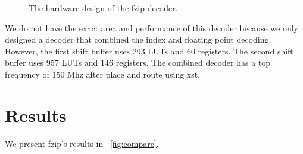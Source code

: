 \begin{figure}
    \caption{The hardware design of the fzip decoder.}
    \label{fig:fzip_decoder}
\end{figure}

We do not have the exact area and performance of this decoder because we only designed a decoder that combined the index and floating point decoding. However, the first shift buffer uses 293 LUTs and 60 registers. The second shift buffer uses 957 LUTs and 146 registers. The combined decoder has a top frequency of 150 Mhz after place and route using xst.
\section{Results}
\label{sec:fzipdiscussion}
We present fzip's results in \figurename~\ref{fig:compare}.
